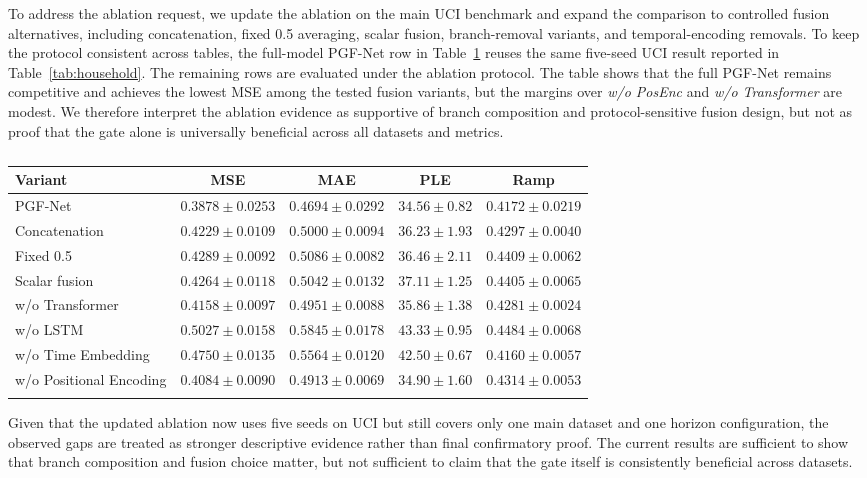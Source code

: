 \documentclass[pdflatex,sn-mathphys-num]{sn-jnl}
\theoremstyle{thmstyleone}
\theoremstyle{thmstyletwo}
\theoremstyle{thmstylethree}
\begin{document}
To address the ablation request, we update the ablation on the main UCI benchmark and expand the comparison to controlled fusion alternatives, including concatenation, fixed 0.5 averaging, scalar fusion, branch-removal variants, and temporal-encoding removals. To keep the protocol consistent across tables, the full-model PGF-Net row in Table~\ref{tab:ablation} reuses the same five-seed UCI result reported in Table~\ref{tab:household}. The remaining rows are evaluated under the ablation protocol. The table shows that the full PGF-Net remains competitive and achieves the lowest MSE among the tested fusion variants, but the margins over \textit{w/o PosEnc} and \textit{w/o Transformer} are modest. We therefore interpret the ablation evidence as supportive of branch composition and protocol-sensitive fusion design, but not as proof that the gate alone is universally beneficial across all datasets and metrics.

\begin{table}[htbp]
\caption{\CapTabAblation}
\label{tab:ablation}
\centering
\scriptsize
\setlength{\tabcolsep}{2pt}
\begin{tabular}{lcccc}
\toprule
Variant & MSE & MAE & PLE & Ramp \\
\midrule
PGF-Net & $0.3878\pm0.0253$ & $0.4694\pm0.0292$ & $34.56\pm0.82$ & $0.4172\pm0.0219$ \\
Concatenation & $0.4229\pm0.0109$ & $0.5000\pm0.0094$ & $36.23\pm1.93$ & $0.4297\pm0.0040$ \\
Fixed 0.5 & $0.4289\pm0.0092$ & $0.5086\pm0.0082$ & $36.46\pm2.11$ & $0.4409\pm0.0062$ \\
Scalar fusion & $0.4264\pm0.0118$ & $0.5042\pm0.0132$ & $37.11\pm1.25$ & $0.4405\pm0.0065$ \\
w/o Transformer & $0.4158\pm0.0097$ & $0.4951\pm0.0088$ & $35.86\pm1.38$ & $0.4281\pm0.0024$ \\
w/o LSTM & $0.5027\pm0.0158$ & $0.5845\pm0.0178$ & $43.33\pm0.95$ & $0.4484\pm0.0068$ \\
w/o Time Embedding & $0.4750\pm0.0135$ & $0.5564\pm0.0120$ & $42.50\pm0.67$ & $0.4160\pm0.0057$ \\
w/o Positional Encoding & $0.4084\pm0.0090$ & $0.4913\pm0.0069$ & $34.90\pm1.60$ & $0.4314\pm0.0053$ \\
\botrule
\end{tabular}
\normalsize
\end{table}

Given that the updated ablation now uses five seeds on UCI but still covers only one main dataset and one horizon configuration, the observed gaps are treated as stronger descriptive evidence rather than final confirmatory proof. The current results are sufficient to show that branch composition and fusion choice matter, but not sufficient to claim that the gate itself is consistently beneficial across datasets.
\end{document}
